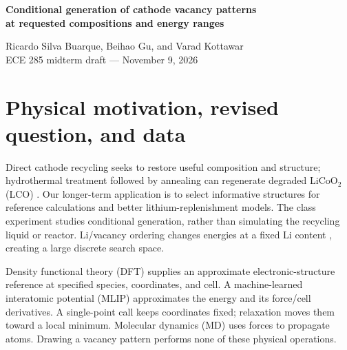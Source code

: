 \documentclass[10pt]{article}
\begin{document}
\begin{center}
{\Large\bfseries Conditional generation of cathode vacancy patterns\\
at requested compositions and energy ranges}\par
\vspace{4pt}
Ricardo Silva Buarque, Beihao Gu, and Varad Kottawar\\
ECE 285 midterm draft --- November 9, 2026
\end{center}
\begin{abstract}
We study whether conditional variational autoencoders (CVAEs) efficiently propose
new Li/vacancy arrangements at specified compositions and energy ranges in a
fixed layered LiCoO$_2$ parent. Exact-count decoding enforces composition, while
energy control must be learned and independently measured. Earlier binary and
multibin models enriched low energies relative to uniform sampling but lost to
frozen low-energy-seed mutation. The extension separates training-policy,
latent-size, symmetry, and physical-neighbor effects, and audits whether deletion
energies represent relaxed ordering. Causal decoder neighborhoods improve final
requested-bin yield over frozen mutation under UMA and MACE, while latent-use
diagnostics limit attribution to the variational pathway. Teacher-defined success
is distinguished from DFT accuracy and relaxed geometry generation.
\end{abstract}

\section{Physical motivation, revised question, and data}
Direct cathode recycling seeks to restore useful composition and structure;
hydrothermal treatment followed by annealing can regenerate degraded LiCoO$_2$
(LCO) \cite{shi2018}. Our longer-term application is to select informative
structures for reference calculations and better lithium-replenishment models.
The class experiment studies conditional generation, rather than simulating the
recycling liquid or reactor. Li/vacancy ordering changes energies at a fixed Li
content \cite{vanderVen1998}, creating a large discrete search space.

Density functional theory (DFT) supplies an approximate electronic-structure
reference at specified species, coordinates, and cell. A machine-learned
interatomic potential (MLIP) approximates the energy and its force/cell
derivatives. A single-point call keeps coordinates fixed; relaxation moves them
toward a local minimum. Molecular dynamics (MD) uses forces to propagate atoms.
Drawing a vacancy pattern performs none of these physical operations.
\end{document}
